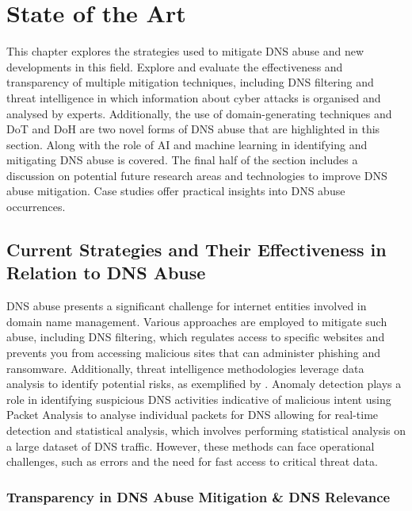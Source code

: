 \chapter{State of the Art}

This chapter explores the strategies used to mitigate DNS abuse and new developments in this field. Explore and evaluate the effectiveness and transparency of multiple mitigation techniques, including DNS filtering and threat intelligence in which information about cyber attacks is organised and analysed by experts. Additionally, the use of domain-generating techniques and DoT and DoH are two novel forms of DNS abuse that are highlighted in this section. Along with the role of AI and machine learning in identifying and mitigating DNS abuse is covered. The final half of the section includes a discussion on potential future research areas and technologies to improve DNS abuse mitigation. Case studies offer practical insights into DNS abuse occurrences. 


\section{Current Strategies and Their Effectiveness in Relation to DNS Abuse}


DNS abuse presents a significant challenge for internet entities involved in domain name management. Various approaches are employed to mitigate such abuse, including DNS filtering, which regulates access to specific websites and prevents you from accessing malicious sites that can administer phishing and ransomware. Additionally, threat intelligence methodologies leverage data analysis to identify potential risks, as exemplified by \cite{schmid2021thirty}. Anomaly detection plays a role in identifying suspicious DNS activities indicative of malicious intent using Packet Analysis to analyse individual packets for DNS allowing for real-time detection and statistical analysis, which involves performing statistical analysis on a large dataset of DNS traffic. However, these methods can face operational challenges, such as errors and the need for fast access to critical threat data. 

\subsection{Transparency in DNS Abuse Mitigation \& DNS Relevance}

